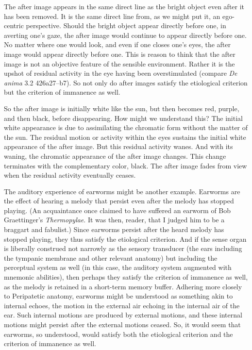 The after image appears in the same direct line as the bright object even after it has been removed. It is the same direct line from, as we might put it, an ego-centric perspective. Should the bright object appear directly before one, in averting one's gaze, the after image would continue to appear directly before one. No matter where one would look, and even if one closes one's eyes, the after image would appear directly before one. This is reason to think that the after image is not an objective feature of the sensible environment. Rather it is the upshot of residual activity in the eye having been overstimulated (compare \emph{De anima} 3.2 426a27–b7). So not only do after images satisfy the etiological criterion but the criterion of immanence as well.

So the after image is initially white like the sun, but then becomes red, purple, and then black, before disappearing. How might we understand this? The initial white appearance is due to assimilating the chromatic form without the matter of the sun. The residual motion or activity within the eyes sustains the initial white appearance of the after image. But this residual activity wanes. And with its waning, the chromatic appearance of the after image changes. This change terminates with the complementary color, black. The after image fades from view when the residual activity eventually ceases.

The auditory experience of earworms might be another example. Earworms are the effect of hearing a melody that persist even after the melody has stopped playing. (An acquaintance once claimed to have suffered an earworm of Bob Graettinger's \emph{Thermopylae}. It was then, reader, that I judged him to be a braggart and fabulist.) Since earworms persist after the heard melody has stopped playing, they thus satisfy the etiological criterion. And if the sense organ is liberally construed not narrowly as the sensory transducer (the ears including the tympanic membrane and other relevant anatomy) but including the perceptual system as well (in this case, the auditory system augmented with mnemonic abilities), then perhaps they satisfy the criterion of immanence as well, as the melody is retained in a short-term memory buffer. Adhering more closely to Peripatetic anatomy, earworms might be understood as something akin to internal echoes, the motion in the external air echoing in the internal air of the ear. Such internal motions are produced by external motions, and these internal motions might persist after the external motions ceased. So, it would seem that earworms, so understood, would satisfy both the etiological criterion and the criterion of immanence as well.

